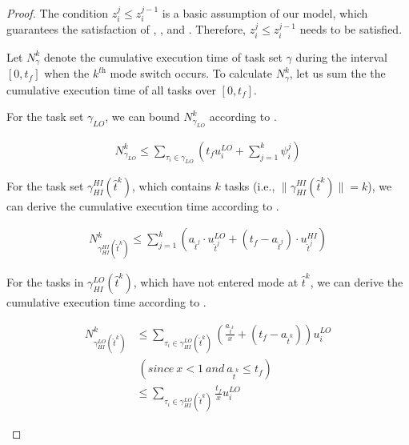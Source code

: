 \documentclass[10pt,journal,compsoc]{IEEEtran}
\begin{document}
\begin{proof}
The condition $z_i^{j}\le{z_i^{j-1}}$ is a basic assumption of our model, which guarantees the satisfaction of , , and . Therefore, $z_i^{j}\le{z_i^{j-1}}$ needs to be satisfied.

Let $N^{k}_{\gamma}$ denote the cumulative execution time of task set $\gamma$ during the interval $[0,t_f]$ when the $k^{\textit{th}}$ mode switch occurs. To calculate $N^{k}_{\gamma}$, let us sum the the cumulative execution time of all tasks over $[0,t_f]$. 

For the \lo task set $\gamma_{LO}$, we can bound $N^{k}_{\gamma_{LO}}$ according to .
\begin{small}
\begin{align}
N^{k}_{\gamma_{LO}}\le{}\sum_{\tau_i\in\gamma_{LO}}(t_fu_i^{LO}+\sum_{j=1}^{k}{\psi_i^{j}})
\label{eq:1}
\end{align}
\end{small}

For the \hi task set $\gamma_{HI}^{HI}(\hat{t}^{k})$, which contains $k$ \hi tasks (i.e., $\|\gamma_{HI}^{HI}(\hat{t}^{k})\|=k$), we can derive the cumulative execution time according to .
\begin{small}
\begin{align}
N^{k}_{\gamma_{HI}^{HI}(\hat{t}^{k})}\le{}\sum_{j=1}^{k}{(a_{\hat{t}^j}\cdot{}u_{\hat{t}^j}^{LO}+(t_f-a_{\hat{t}^j})\cdot{}u_{\hat{t}^j}^{HI})}
\label{eq:2}
\end{align}
\end{small}

For the \hi tasks in $\gamma_{HI}^{LO}(\hat{t}^{k})$, which have not entered \hi mode at $\hat{t}^{k}$, we can derive the cumulative execution time according to .  
\begin{small}
\begin{align}
N^{k}_{\gamma_{HI}^{LO}(\hat{t}^{k})}&\le{}\sum_{\tau_i\in\gamma_{HI}^{LO}(\hat{t}^{k})}{(\frac{a_{\hat{t}^k}}{x}+(t_f-a_{\hat{t}^k}))u_{i}^{LO}}  \nonumber \\
&\ (since \ x<1\ and\ a_{\hat{t}^k}\le{t_f}) \nonumber\\
&\le{}\sum_{\tau_i\in\gamma_{HI}^{LO}(\hat{t}^{k})}{\frac{t_f}{x}u_{i}^{LO}} 
\label{eq:3}
\end{align}
\end{small}



\end{proof}
\end{document}
